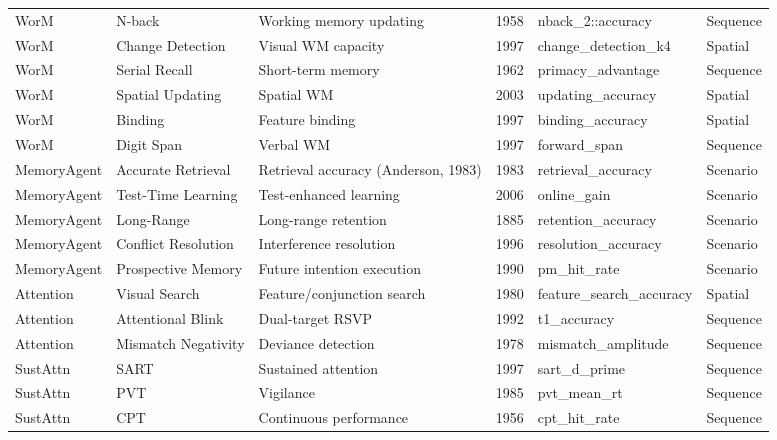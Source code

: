 \documentclass[10pt,landscape]{article}
\begin{document}
\begin{longtable}{@{}p{2.3cm}p{3.0cm}p{4.5cm}p{0.6cm}p{3.8cm}p{1.8cm}@{}}
\midrule
WorM & N-back & Working memory updating \citep{jaeggi2010relationship} & 1958 & nback\_2::accuracy & Sequence \\
WorM & Change Detection & Visual WM capacity \citep{luck1997capacity} & 1997 & change\_detection\_k4 & Spatial \\
WorM & Serial Recall & Short-term memory \citep{murdock1962serial} & 1962 & primacy\_advantage & Sequence \\
WorM & Spatial Updating & Spatial WM \citep{oberauer2003selective} & 2003 & updating\_accuracy & Spatial \\
WorM & Binding & Feature binding \citep{luck1997capacity} & 1997 & binding\_accuracy & Spatial \\
WorM & Digit Span & Verbal WM \citep{wechsler2008wais} & 1997 & forward\_span & Sequence \\

\midrule
MemoryAgent & Accurate Retrieval & Retrieval accuracy (Anderson, 1983) & 1983 & retrieval\_accuracy & Scenario \\
MemoryAgent & Test-Time Learning & Test-enhanced learning & 2006 & online\_gain & Scenario \\
MemoryAgent & Long-Range & Long-range retention & 1885 & retention\_accuracy & Scenario \\
MemoryAgent & Conflict Resolution & Interference resolution & 1996 & resolution\_accuracy & Scenario \\
MemoryAgent & Prospective Memory & Future intention execution & 1990 & pm\_hit\_rate & Scenario \\

\midrule
Attention & Visual Search & Feature/conjunction search & 1980 & feature\_search\_accuracy & Spatial \\
Attention & Attentional Blink & Dual-target RSVP & 1992 & t1\_accuracy & Sequence \\
Attention & Mismatch Negativity & Deviance detection & 1978 & mismatch\_amplitude & Sequence \\

\midrule
SustAttn & SART & Sustained attention \citep{robertson1997sustained} & 1997 & sart\_d\_prime & Sequence \\
SustAttn & PVT & Vigilance & 1985 & pvt\_mean\_rt & Sequence \\
SustAttn & CPT & Continuous performance & 1956 & cpt\_hit\_rate & Sequence \\


\end{longtable}
\end{document}
